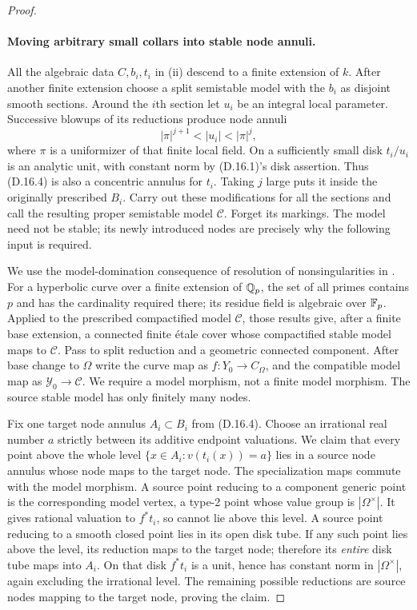 \begin{proof}
\paragraph{Moving arbitrary small collars into stable node annuli.}
All the algebraic data $C,b_i,t_i$ in (ii) descend to a finite
extension of $k$. After another finite extension choose a split
semistable model with the $b_i$ as disjoint smooth sections.
Around the $i$th section let $u_i$ be an integral local parameter.
Successive blowups of its reductions produce node annuli
\[
                  |\pi|^{j+1}<|u_i|<|\pi|^j,
 \tag{D.16.4}
\]
where $\pi$ is a uniformizer of that finite local field.
On a sufficiently small disk $t_i/u_i$ is an analytic unit,
with constant norm by (D.16.1)'s disk assertion. Thus (D.16.4)
is also a concentric annulus for $t_i$. Taking $j$ large puts
it inside the originally prescribed $B_i$. Carry out these
modifications for all the sections and call the resulting
proper semistable model $\mathcal C$. Forget its markings.
The model need not be stable; its newly introduced nodes
are precisely why the following input is required.

We use the model-domination consequence of resolution of
nonsingularities in
\citet[Theorem A and Proposition 2.4(iv)]{D_MochizukiTsujimura2024}.
For a hyperbolic curve over a finite extension of $\mathbb Q_p$, the set
of all primes contains $p$ and has the cardinality required there;
its residue field is algebraic over $\mathbb F_p$. Applied to the
prescribed compactified model $\mathcal C$, those results give,
after a finite base extension, a connected finite \'etale cover
whose compactified stable model maps to $\mathcal C$.
Pass to split reduction and a geometric connected component.
After base change to $\Omega$ write the curve map as
$f:Y_0\to C_\Omega$, and the compatible model map as
$\mathcal Y_0\to\mathcal C$. We require a model morphism,
not a finite model morphism. The source stable model has only
finitely many nodes.

Fix one target node annulus $A_i\subset B_i$ from (D.16.4).
Choose an irrational real number $a$ strictly between its
additive endpoint valuations. We claim that every point above
the whole level $\{x\in A_i:v(t_i(x))=a\}$ lies in a source
node annulus whose node maps to the target node.
The specialization maps commute with the model morphism.
A source point reducing to a component generic point is the
corresponding model vertex, a type-2 point whose value group is
$|\Omega^\times|$. It gives rational valuation to $f^*t_i$,
so cannot lie above this level. A source point reducing to a
smooth closed point lies in its open disk tube. If any such
point lies above the level, its reduction maps to the target
node; therefore its \emph{entire} disk tube maps into $A_i$.
On that disk $f^*t_i$ is a unit, hence has constant norm in
$|\Omega^\times|$, again excluding the irrational level.
The remaining possible reductions are source nodes mapping
to the target node, proving the claim.


\end{proof}
